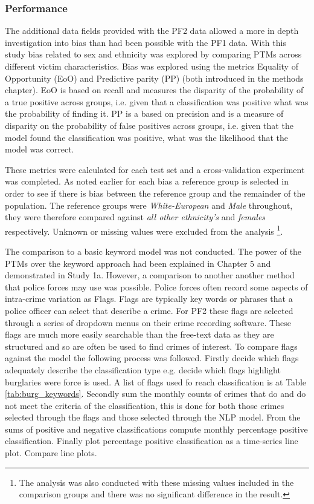 \subsubsection{Performance} The additional data fields provided with the PF2 data allowed a more in depth investigation into bias than had been possible with the PF1 data. With this study bias related to sex and ethnicity was explored by comparing PTMs across different victim characteristics. Bias was explored using the metrics Equality of Opportunity (EoO) and Predictive parity (PP) (both introduced in the methods chapter). EoO is based on recall and measures the disparity of the probability of a true positive across groups, i.e. given that a classification was positive what was the probability of finding it.  PP is a based on precision and is a measure of disparity on the probability of false positives across groups, i.e. given that the model found the classification was positive, what was the likelihood that the model was correct. 

These metrics were calculated for each test set and a cross-validation experiment was completed. As noted earlier for each bias a reference group is selected in order to see if there is bias between the reference group and the remainder of the population. The reference groups were \emph{White-European} and \emph{Male} throughout, they were therefore compared against \emph{all other ethnicity's} and \emph{females} respectively. Unknown or missing values were excluded from the analysis \footnote{The analysis was also conducted with these missing values included in the comparison groups and there was no significant difference in the result.}. 

The comparison to a basic keyword model was not conducted. The power of the PTMs over the keyword approach had been explained in Chapter 5 and demonstrated in Study 1a. However, a comparison to another another method that police forces may use was possible. Police forces often record some aspects of intra-crime variation as Flags. Flags are typically key words or phrases that a police officer can select that describe a crime. For PF2 these flags are selected through a series of dropdown menus on their crime recording software. These flags are much more easily searchable than the free-text data as they are structured and so are often be used to find crimes of interest. To compare flags against the model the following process was followed. Firstly decide which flags adequately describe the classification type e.g. decide which flags highlight burglaries were force is used. A  list of flags used fo reach classification is at Table \ref{tab:burg_keywords}. Secondly sum the monthly counts of crimes that do and do not meet the criteria of the classification, this is done for both those crimes selected through the flags and those selected through the NLP model. From the sums of positive and negative classifications compute monthly percentage positive classification. Finally plot percentage positive classification as a time-series line plot. Compare line plots.

